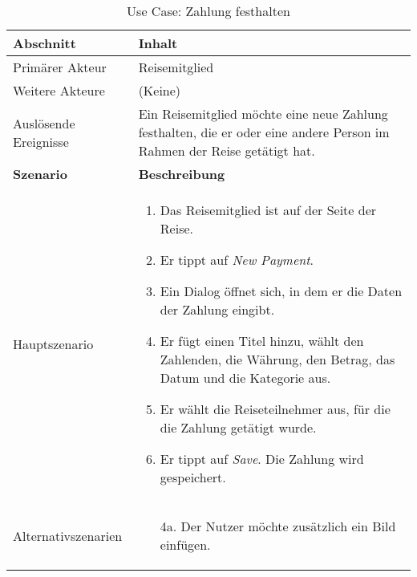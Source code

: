 \begin{table}[H]
	\footnotesize
	\caption{Use Case: Zahlung festhalten}
	\begin{tabularx}{0.95\textwidth}{ |l|X| }
		\hline
		\rowcolor{gray} \textbf{Abschnitt}     & \textbf{Inhalt}                                                                                                              \\
		\hline
		Primärer Akteur                        & Reisemitglied                                                                                                                \\
		\hline
		Weitere Akteure                        & (Keine)                                                                                                                      \\
		\hline
		Auslösende Ereignisse                  & Ein Reisemitglied möchte eine neue Zahlung festhalten, die er oder eine andere Person im Rahmen der Reise getätigt hat.      \\
		\hline
		\rowcolor{lightgray} \textbf{Szenario} & \textbf{Beschreibung}                                                                                                        \\
		\hline
		Hauptszenario                          & \begin{enumerate}
			                                         \item Das Reisemitglied ist auf der Seite der Reise.
			                                         \item Er tippt auf \emph{New Payment}.
			                                         \item Ein Dialog öffnet sich, in dem er die Daten der Zahlung eingibt.
			                                         \item Er fügt einen Titel hinzu, wählt den Zahlenden, die Währung, den Betrag, das Datum und die Kategorie aus.
			                                         \item Er wählt die Reiseteilnehmer aus, für die die Zahlung getätigt wurde.
			                                         \item Er tippt auf \emph{Save}. Die Zahlung wird gespeichert.
		                                         \end{enumerate}               \\
		\hline
		Alternativszenarien                    & \begin{enumerate}
			                                         \item[4a.] Der Nutzer möchte zusätzlich ein Bild einfügen.

\end{enumerate}
\end{tabularx}
\end{table}
